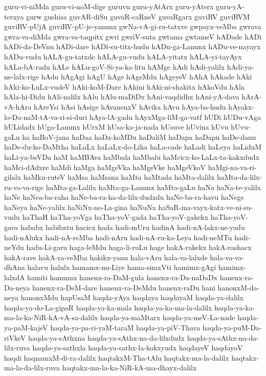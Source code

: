 {guru-vi-niMda
guru-vi-noM-dige
guruvu
guru-yAtArx
guru-yAterx
guru-yA-terxya
gurw
gushisa
guvAR-diSu
guvaR-caRneV
guvaRgarx
guviRV
guviRVM
guviRV-pUjA
guviRV-pU-je-yanunx
gwNa-vA-gi-ru-tatxve
gwpayx-veMba
gwrava
gwra-va-diMda
gwra-va-taqpitx
gwri
gwriV-suta
gwtama
gwtameV
hADade
hADi
hADi-da-DeVnu
hADi-dare
hADi-su-titx-hudu
hADu-ga-Lanunx
hADu-ve-nayayx
hADu-vudu
hALA-gu-tatxde
hALA-gu-vudu
hALA-yitatx
hALA-yi-tayAyx
hALa-bA-radu
hALe
hALu-goV-Si-ya-ka-litu
hAMge
hAdi
hAdi-yalilx
hAdi-ya-ne-lalx-rige
hAdu
hAgAgi
hAgU
hAge
hAgeMdu
hAgeyeV
hAhA
hAkade
hAki
hAki-ko-LuLx-vudeV
hAki-koM-Dare
hAkini
hAki-ni-shakitx
hAkoVdu
hAla
hAla-hi-Didu
hAli-nalilx
hAlu
hAlu-maDiDx
hAni-vaqdidhx
hAni-yA-dava
hArA-vA-hAra
hAreYsi
hAsi
hAsige
hAvanenxV
hAvika
hAvu
hAya-ba-hudu
hAyakx-lo-Da-naM-tA-va-ri-si-duri
hAya-lA-gadu
hAyxMga-liM-ga-vatf
hUDi
hUDu-vAga
hULidadx
hUga-Lanunx
hUrxM
hUsa-ka-ja-nada
hUsuve
hUvina
hUvu
hUvu-gaLu
ha
haBoV-jana
haDaa
haDa-koMDu
haDaliM
haDapa
haDapu
haDe-danu
haDe-du-ko-DaMtha
haLaLx
haLaLx-do-Liha
haLa-cade
haLadi
haLeya
haLiduM
haLi-ya-beVDa
haM
haMBAva
haMbala
haMbalu
haMcicx-ko-LaLx-ta-kakxdudx
haMci-dAdxre
haMdi
haMga
haMgeVka
haMgeVke
haMgeVkoV
haMgi-na-va-ri-gilalx
haMku-ruteV
haMsa
haMsana
haMta
haMtada
haMta-dalilx
haMta-da-lilx-ru-va-va-rige
haMta-ga-Lalilx
haMta-ga-Lanunx
haMta-gaLu
haNa
haNa-te-yalilx
haNe
haNea-ba-raha
haNe-ba-ra-ha-da-lilx-dudxdu
haNe-ba-ra-havu
haNege
haNeya
haNe-yalilx
haNiNx-no-La-gina
haNuNx
haSaR-ma-vayx-katx-ve-ni-su-vudu
haThaH
haTha-yoVga
haTha-yoV-gada
haTha-yoV-gakekx
haTha-yoV-gava
hababx
habibxtu
hacicx
hada
hadi-mUru
hadinA
hadi-nA-lakx-ne-yadu
hadi-nAlukx
hadi-nA-reMba
hadi-nAru
hadi-nA-ru-ka-Leya
hadi-neMTu
hadi-neYdu
hadu-Li-garu
haga-leMdu
haga-li-ruLu
hage
hakA-rakekx
hakA-rashacx
hakA-rave
hakA-ra-veMba
hakikx-yanu
hala-vAru
hala-va-lalxde
hala-va-va-dhAna
halavu
halulx
hamamx-nu-Liye
hama-simxVti
hamimx-gAgi
hamimx-lalxdA
hamiti
hamumx
hanenx-ra-DaM-gula
hanenx-ra-Da-naDaDx
hanenx-ra-Da-neya
hanenx-ra-DeM-dare
hanenx-ra-DeMdu
hanenx-raDu
hani
hanonxM-da-neya
hanonxMdu
hapUsaM
haqda-yAya
haqdaya
haqdayaM
haqda-ya-dalilx
haqda-ya-do-La-gipaR
haqda-ya-ka-mala
haqda-ya-ka-ma-la-dalilx
haqda-ya-ka-ma-la-ka-NiR-kA-vA-sa-dalilx
haqda-ya-maMtarx
haqda-ya-meV-La-nade
haqda-ya-paM-kajeV
haqda-ya-pa-ri-yaM-taraM
haqda-ya-piV-Thava
haqda-ya-puM-Da-riVkeV
haqda-ya-sAthxna
haqda-ya-sAthx-na-da-lilxdudx
haqda-ya-sAthx-na-da-lilx-ruva
haqda-ya-sathxla
haqda-ya-sathx-la-kokxyudx
haqdayeV
haqdayoV
haqdi
haqnamxM-di-ra-dalilx
haqtakxM-Tha-tAlu
haqtakx-ma-la-dalilx
haqtakx-ma-la-da-lilx-ruva
haqtakx-ma-la-ka-NiR-kA-ma-dhayx-dalilx
}
